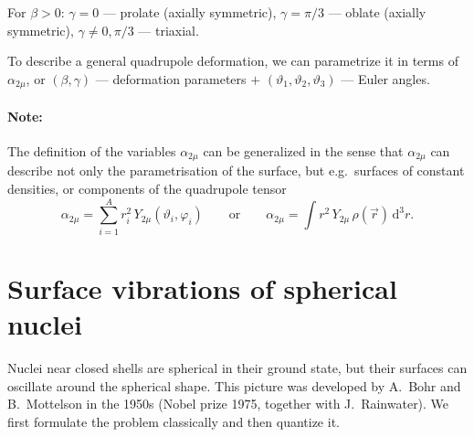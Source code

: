 \documentclass[11pt,a4paper]{article}
\newcommand{\ud}{\mathrm{d}}
\begin{document}
For $\beta>0$: $\gamma=0$ --- prolate (axially symmetric), $\gamma=\pi/3$ --- oblate (axially symmetric), $\gamma\neq0,\pi/3$ --- triaxial.
\begin{center}
\end{center}
To describe a general quadrupole deformation, we can parametrize it in terms of $\alpha_{2\mu}$, or $(\beta,\gamma)$ --- deformation parameters $+$ $(\vartheta_1,\vartheta_2,\vartheta_3)$ --- Euler angles.

\paragraph{Note:} The definition of the variables $\alpha_{2\mu}$ can be generalized in the sense that $\alpha_{2\mu}$ can describe not only the parametrisation of the surface, but e.g.\ surfaces of constant densities, or components of the quadrupole tensor
\[
\alpha_{2\mu}=\sum_{i=1}^Ar_i^2\,Y_{2\mu}(\vartheta_i,\varphi_i)\qquad\text{or}\qquad
\alpha_{2\mu}=\int r^2\,Y_{2\mu}\,\rho(\vec r)\,\ud^3r .
\]

\section{Surface vibrations of spherical nuclei}

Nuclei near closed shells are spherical in their ground state, but their surfaces can oscillate around the spherical shape. This picture was developed by A.~Bohr and B.~Mottelson in the 1950s (Nobel prize 1975, together with J.~Rainwater). We first formulate the problem classically and then quantize it.
\end{document}
